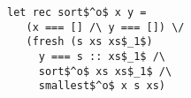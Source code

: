 

\begin{figure}[h]
  \centering
  \begin{minipage}{0.65\columnwidth}
    \begin{lstlisting}[frame=tb,language=ocanren1]
 let rec sort$^o$ x y = 
   (x === [] /\ y === []) \/
   (fresh (s xs xs$_1$)
     y === s :: xs$_1$ /\
     sort$^o$ xs xs$_1$ /\
     smallest$^o$ x s xs)
    \end{lstlisting}
  \end{minipage}
\end{figure}
